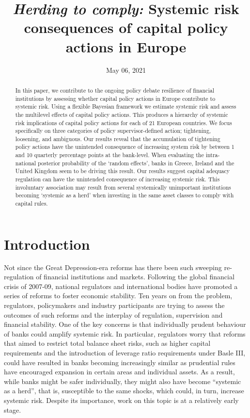 \documentclass[
  10pt,
]{article}
\title{\emph{Herding to comply:} Systemic risk consequences of capital policy
actions in Europe}
\author{}
\date{\vspace{-2.5em}May 06, 2021}
\begin{document}
\maketitle
\begin{abstract}
In this paper, we contribute to the ongoing policy debate resilience of
financial institutions by assessing whether capital policy actions in
Europe contribute to systemic risk. Using a flexible Bayesian framework
we estimate systemic risk and assess the multilevel effects of capital
policy actions. This produces a hierarchy of systemic risk implications
of capital policy actions for each of 21 European countries. We focus
specifically on three categories of policy supervisor-defined action;
tightening, loosening, and ambiguous. Our results reveal that the
accumulation of tightening policy actions have the unintended
consequence of increasing system risk by between 1 and 10 quarterly
percentage points at the bank-level. When evaluating the intra-national
posterior probability of the `random effects', banks in Greece, Ireland
and the United Kingdom seem to be driving this result. Our results
suggest capital adequacy regulation can have the unintended consequence
of increasing systemic risk. This involuntary association may result
from several systemically unimportant institutions becoming `systemic as
a herd' when investing in the same asset classes to comply with capital
rules.
\end{abstract}

\hypertarget{introduction}{%
\section{Introduction}\label{introduction}}

Not since the Great Depression-era reforms has there been such sweeping
re-regulation of financial institutions and markets. Following the
global financial crisis of 2007-09, national regulators and
international bodies have promoted a series of reforms to foster
economic stability. Ten years on from the problem, regulators,
policymakers and industry participants are trying to assess the outcomes
of such reforms and the interplay of regulation, supervision and
financial stability. One of the key concerns is that individually
prudent behaviour of banks could amplify systemic risk. In particular,
regulators worry that reforms that aimed to restrict total balance sheet
risks, such as higher capital requirements and the introduction of
leverage ratio requirements under Basle III, could have resulted in
banks becoming increasingly similar as prudential rules have encouraged
expansion in certain areas and individual assets. As a result, while
banks might be safer individually, they might also have become
``systemic as a herd'', that is, susceptible to the same shocks, which
could, in turn, increase systemic risk. Despite its importance, work on
this topic is at a relatively early stage.
\end{document}
